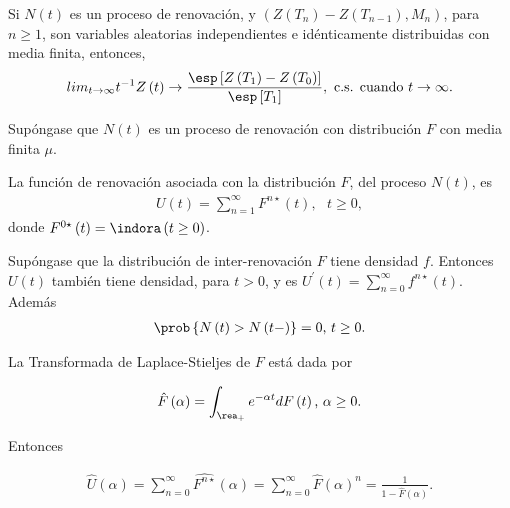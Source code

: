 \begin{Coro}
Si $N\left(t\right)$ es un proceso de renovaci\'on, y $\left(Z\left(T_{n}\right)-Z\left(T_{n-1}\right),M_{n}\right)$, para $n\geq1$, son variables aleatorias independientes e id\'enticamente distribuidas con media finita, entonces,
\begin{eqnarray}
lim_{t\rightarrow\infty}t^{-1}Z\left(t\right)\rightarrow\frac{\esp\left[Z\left(T_{1}\right)-Z\left(T_{0}\right)\right]}{\esp\left[T_{1}\right]},\textrm{ c.s. cuando  }t\rightarrow\infty.
\end{eqnarray}
\end{Coro}


Sup\'ongase que $N\left(t\right)$ es un proceso de renovaci\'on con distribuci\'on $F$ con media finita $\mu$.

\begin{Def}
La funci\'on de renovaci\'on asociada con la distribuci\'on $F$, del proceso $N\left(t\right)$, es
\begin{eqnarray*}
U\left(t\right)=\sum_{n=1}^{\infty}F^{n\star}\left(t\right),\textrm{   }t\geq0,
\end{eqnarray*}
donde $F^{0\star}\left(t\right)=\indora\left(t\geq0\right)$.
\end{Def}


\begin{Prop}
Sup\'ongase que la distribuci\'on de inter-renovaci\'on $F$ tiene densidad $f$. Entonces $U\left(t\right)$ tambi\'en tiene densidad, para $t>0$, y es $U^{'}\left(t\right)=\sum_{n=0}^{\infty}f^{n\star}\left(t\right)$. Adem\'as
\begin{eqnarray*}
\prob\left\{N\left(t\right)>N\left(t-\right)\right\}=0\textrm{,   }t\geq0.
\end{eqnarray*}
\end{Prop}

\begin{Def}
La Transformada de Laplace-Stieljes de $F$ est\'a dada por

\begin{eqnarray*}
\hat{F}\left(\alpha\right)=\int_{\rea_{+}}e^{-\alpha t}dF\left(t\right)\textrm{,  }\alpha\geq0.
\end{eqnarray*}
\end{Def}

Entonces

\begin{eqnarray*}
\hat{U}\left(\alpha\right)=\sum_{n=0}^{\infty}\hat{F^{n\star}}\left(\alpha\right)=\sum_{n=0}^{\infty}\hat{F}\left(\alpha\right)^{n}=\frac{1}{1-\hat{F}\left(\alpha\right)}.
\end{eqnarray*}



